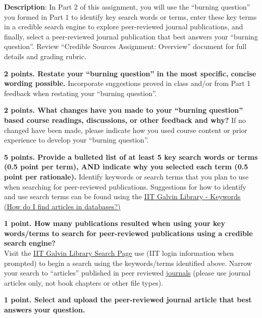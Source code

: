 \documentclass[title={Credible Sources - Literature Review and Article Selection},points={30}]{fdsn201homework}
\let\oldhref\href
\renewcommand{\href}[2]{\oldhref{#1}{\underline{#2}}}
\begin{document}
\maketitle

\noindent%
\textbf{Description}: In Part 2 of this assignment, you will use the ``burning question'' you formed in Part 1 to identify key search words or terms, enter these key terms in a credible search engine to explore peer-reviewed journal publications, and finally, select a peer-reviewed journal publication that best answers your ``burning question''.
Review ``Credible Sources Assignment: Overview'' document for full details and grading rubric.

\begin{problems}
	\item \textbf{2 points. Restate your ``burning question'' in the most specific, concise wording possible.}
	Incorporate suggestions proved in class and/or from Part 1 feedback when restating your ``burning question''.%
	\item \textbf{2 points. What changes have you made to your ``burning question'' based course readings, discussions, or other feedback and why?}
	If no changed have been made, please indicate how you used course content or prior experience to develop your ``burning question''.%
	\item \textbf{5 points. Provide a bulleted list of at least 5 key search words or terms (0.5 point per term), AND indicate why you selected each term (0.5 point per rationale).}
	Identify keywords or search terms that you plan to use when searching for peer-reviewed publications.
	Suggestions for how to identify and use search terms can be found using the \href{https://iit.libanswers.com/faq/292350}{IIT Galvin Library - Keywords (How do I find articles in databases?)}%
	\item \textbf{1 point. How many publications resulted when using your key words/terms to search for peer-reviewed publications using a credible search engine?}\\
	Visit the \href{https://library.iit.edu/}{IIT Galvin Library Search Page} use (IIT login information when prompted) to begin a search using the keywords/terms identified above.
	Narrow your search to ``articles'' published in peer reviewed \underline{journals} (please use journal articles only, not book chapters or other file types).%
	\item \textbf{1 point. Select and upload the peer-reviewed journal article that best answers your question.}\\

\end{problems}
\end{document}
